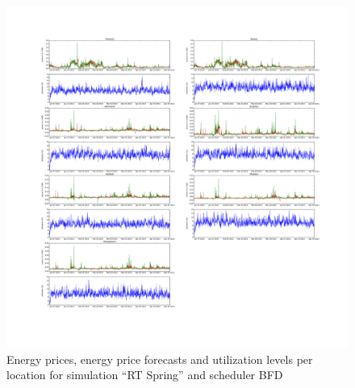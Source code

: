 \begin{figure}[htbp]
	\centering
	\vspace*{-0.6in}
	\hspace*{-1.4in}
		\includegraphics[width=1.60\textwidth]{figures/appendix_simulation_results/RT_Spring_scenario_1.pdf}
	\vspace*{-1.0in}
	\caption{Energy prices, energy price forecasts and utilization levels per location for simulation ``RT Spring'' and scheduler BFD}
	\label{fig:app_RT_Spring_scenario_1}
\end{figure}

